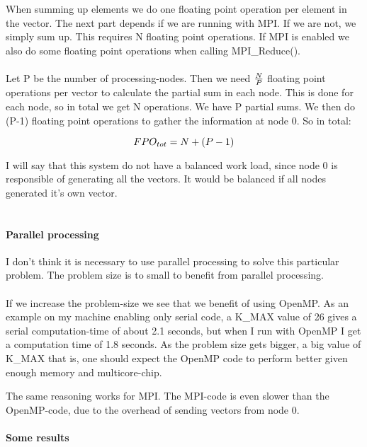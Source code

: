 \documentclass{article}
\begin{document}
When summing up elements we do one floating point operation per element in the vector. The next part depends if we are running with MPI. If we are not, we simply sum up. This requires N floating point operations. If MPI
is enabled we also do some floating point operations when calling MPI\_Reduce(). \\ \\

Let P be the number of processing-nodes. Then we need $N \over P$ floating point operations per vector to calculate the partial sum in each node. This is done for each node, so in total we get N operations. We have P partial sums. We then do (P-1) floating point operations to gather the information at node 0. So in total:

\begin{equation}
	FPO_{tot} = N + (P-1) \\
\end{equation}   


I will say that this system do not have a balanced work load, since node 0 is responsible of generating all the vectors. It would be balanced if all nodes generated it's own vector.\\ \\


\paragraph*{Parallel processing}

I don't think it is necessary to use parallel processing to solve this particular problem. The problem size is to small to benefit from parallel processing. \\ \\
If we increase the problem-size we see that we benefit of using OpenMP. As an example on my machine enabling only serial code, a K\_MAX value of 26 gives a serial computation-time of about 2.1 seconds, but when I run with OpenMP I get a computation time of 1.8 seconds. As the problem size gets bigger, a big value of K\_MAX that is, one should expect the OpenMP code to perform better given enough memory and multicore-chip. 

The same reasoning works for MPI. The MPI-code is even slower than the OpenMP-code, due to the overhead of sending vectors from node 0.

\paragraph*{Some results}
\end{document}

